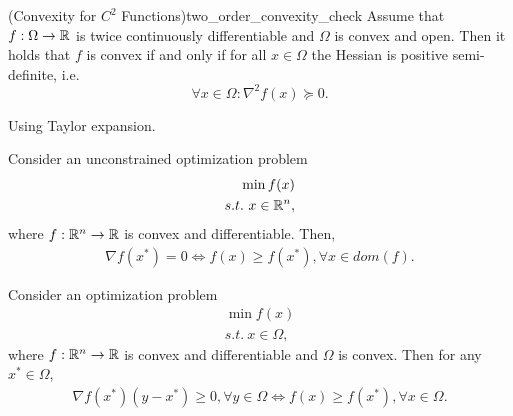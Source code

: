 \begin{theorem}{(Convexity for $C^2$ Functions)}{two_order_convexity_check}
    {
        Assume that $f: \Omega\rightarrow \mathbb{R}$ is twice continuously differentiable and $\Omega$ is convex and open. 
        Then it holds that $f$ is convex if and only if for all $x\in \Omega$ the Hessian is positive semi-definite, i.e.
        \begin{equation}\label{eq:two_order_convexity_check}
            \forall x\in \Omega : \nabla^2 f(x) \succcurlyeq 0. 
        \end{equation}
    }    
\end{theorem}

\begin{proofsolution}
    Using Taylor expansion.
\end{proofsolution}


\begin{theorem}{}{}
    Consider an unconstrained optimization problem
    \begin{align*}
        \min f(x)\\
        s.t.\  x\in \mathbb{R}^n,
    \end{align*}
    where $f:\mathbb{R}^n\rightarrow \mathbb{R}$ is convex and differentiable. Then, 
    \begin{align*}
        \nabla f(x^*)=0 \Longleftrightarrow f(x)\geq f(x^*), \forall x\in dom(f). 
    \end{align*}
\end{theorem}

\begin{proofsolution}

\end{proofsolution}


\begin{theorem}{}{}
    Consider an optimization problem
    \begin{align*}
        \min f(x)\\
        s.t.\  x\in \Omega,
    \end{align*}
    where $f:\mathbb{R}^n\rightarrow \mathbb{R}$ is convex and differentiable and $\Omega$ is convex. Then for any $x^*\in \Omega$, 
    \begin{align*}
        \nabla f(x^*)(y-x^*)\geq 0, \forall y\in \Omega \Longleftrightarrow f(x)\geq f(x^*), \forall x\in \Omega.  
    \end{align*}
\end{theorem}

\begin{proofsolution}

\end{proofsolution}



